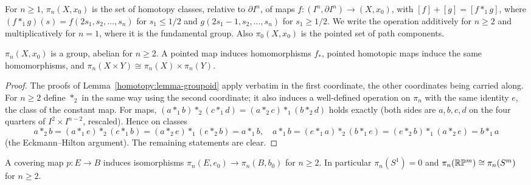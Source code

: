 \begin{definition}\label{homotopy:definition-higher-homotopy}
For $n \geq 1$, $\pi_n(X, x_0)$ is the set of homotopy classes, relative to $\partial I^n$, of maps $f \colon (I^n, \partial I^n) \to (X, x_0)$, with
$[f] + [g] = [f *_1 g]$, where $(f *_1 g)(s) = f(2s_1, s_2, \ldots, s_n)$ for $s_1 \leq 1/2$ and $g(2s_1 - 1, s_2, \ldots, s_n)$ for $s_1 \geq 1/2$. We write the
operation additively for $n \geq 2$ and multiplicatively for $n = 1$, where it is the fundamental group. Also $\pi_0(X, x_0)$ is the pointed set of path components.
\end{definition}

\begin{proposition}\label{homotopy:proposition-higher-abelian}
$\pi_n(X, x_0)$ is a group, abelian for $n \geq 2$. A pointed map induces homomorphisms $f_*$, pointed homotopic maps induce the same homomorphisms, and
$\pi_n(X \times Y) \cong \pi_n(X) \times \pi_n(Y)$.
\end{proposition}

\begin{proof}
The proofs of Lemma~\ref{homotopy:lemma-groupoid} apply verbatim in the first coordinate, the other coordinates being carried along. For $n \geq 2$ define $*_2$ in the
same way using the second coordinate; it also induces a well-defined operation on $\pi_n$ with the same identity $e$, the class of the constant map. For maps,
$(a *_1 b) *_2 (c *_1 d) = (a *_2 c) *_1 (b *_2 d)$ holds exactly (both sides are $a, b, c, d$ on the four quarters of $I^2 \times I^{n-2}$, rescaled). Hence on
classes
\[
a *_2 b = (a *_1 e) *_2 (e *_1 b) = (a *_2 e) *_1 (e *_2 b) = a *_1 b, \quad
a *_1 b = (e *_1 a) *_2 (b *_1 e) = (e *_2 b) *_1 (a *_2 e) = b *_1 a
\]
(the Eckmann--Hilton argument). The remaining statements are clear.
\end{proof}

\begin{proposition}\label{homotopy:proposition-covering-higher}
A covering map $p \colon E \to B$ induces isomorphisms $\pi_n(E, e_0) \to \pi_n(B, b_0)$ for $n \geq 2$. In particular $\pi_n(S^1) = 0$ and
$\pi_n(\mathbb{R}\mathbb{P}^m) \cong \pi_n(S^m)$ for $n \geq 2$.
\end{proposition}

